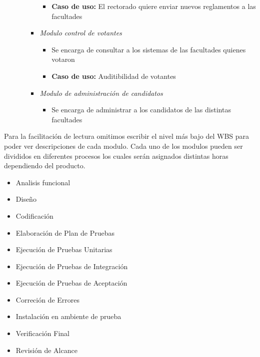\begin{itemize}
\begin{itemize}
\begin{itemize}
\begin{itemize}
 \item {\bf Caso de uso:} El rectorado quiere enviar nuevos reglamentos a las facultades
\end{itemize}
 \item \emph{Modulo control de votantes}
\begin{itemize}
 \item Se encarga de consultar a los sistemas de las facultades quienes votaron
 \item {\bf Caso de uso:} Auditibilidad de votantes
\end{itemize}
 \item \emph{Modulo de administración de candidatos}
\begin{itemize}
 \item Se encarga de administrar a los candidatos de las distintas facultades
\end{itemize}
\end{itemize}
\end{itemize}
\end{itemize}


Para la facilitación de lectura omitimos escribir el nivel más bajo del WBS para poder ver descripciones de cada modulo. Cada uno de los modulos pueden ser divididos en diferentes procesos
los cuales serán asignados distintas horas dependiendo del producto.
\begin{itemize}
 \item Analisis funcional
 \item Diseño
 \item Codificación
 \item Elaboración de Plan de Pruebas
 \item Ejecución de Pruebas Unitarias
 \item Ejecución de Pruebas de Integración
 \item Ejecución de Pruebas de Aceptación
 \item Correción de Errores
 \item Instalación en ambiente de prueba
 \item Verificación Final
 \item Revisión de Alcance
\end{itemize}	
